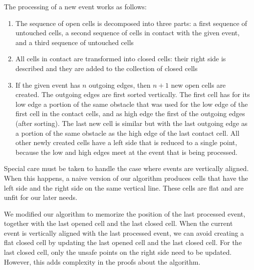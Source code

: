 \documentclass{llncs}
\begin{document}
The processing of a new event works as follows:
\begin{enumerate}
\item The sequence of open cells is decomposed into three parts:
a first sequence of untouched cells, a second sequence of cells in
contact with the given event, and a third sequence of
untouched cells
\item All cells in contact are transformed into closed cells:
their right side is
  described and they are added to the collection of closed cells
\item If the given event has \(n\) outgoing edges, then \(n+1\) new
  open cells are created.  The outgoing edges are first sorted vertically.
  The first cell has for its low edge a portion of the same obstacle that
  was used for the low edge of the first cell in the contact cells, and
  as high edge the first of the outgoing edges (after sorting).  The
  last new cell is similar but with the last outgoing edge as a portion
  of the same obstacle as the high edge of the last contact cell.
  All other newly created cells have a
  left side that is reduced to a single point, because the low and
  high edges meet at the event that is being processed.
\end{enumerate}

Special care must be taken to handle the case where events are
vertically aligned.  When this happens, a naive version of our
algorithm produces cells that have the left side and the right side on the
same vertical line.  These cells are flat and are unfit for our later needs.

We modified our algorithm to memorize the
position of the last processed event, together with the last opened
cell and the last closed cell.  When the current event is vertically
aligned with the last processed event, we can avoid creating a flat
closed cell by updating the last opened cell and the last closed
cell.  For the last closed cell, only the unsafe points on the right side
need to be updated.  However, this adds complexity in the proofs about the
algorithm.
\end{document}
